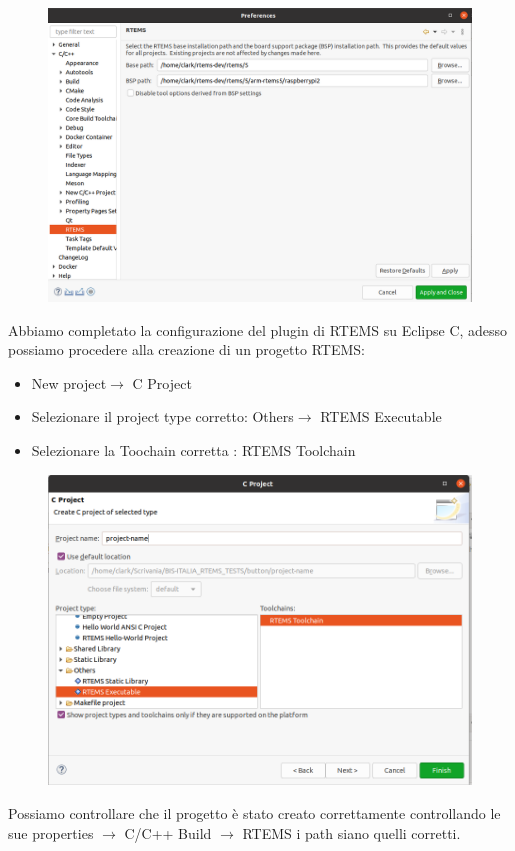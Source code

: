 \documentclass[10pt, a4paper]{article}
\begin{document}
\begin{flushleft}
\begin{figure}[h!]
\includegraphics[width=\linewidth]{rtems-path-eclipse.png}
\end{figure}

\newpage

Abbiamo completato la configurazione del plugin di RTEMS su Eclipse C, adesso possiamo procedere alla creazione di un progetto RTEMS:
\begin{itemize}
\item New project$\rightarrow$ C Project
\item Selezionare il project type corretto: Others$\rightarrow$ RTEMS Executable
\item Selezionare la Toochain corretta : RTEMS Toolchain
\end{itemize}
\begin{figure}[h!]
\includegraphics[width=\linewidth]{new-c-project.png}
\end{figure}
Possiamo controllare che il progetto è stato creato correttamente controllando le sue properties $\rightarrow$ C/C++ Build $\rightarrow$ RTEMS i path siano quelli corretti.


\end{flushleft}
\end{document}
